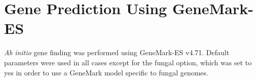 




\section{Gene Prediction Using GeneMark-ES}

\textit{Ab initio} gene finding was performed using GeneMark-ES
v4.71\cite{Borodovsky2011}. Default parameters were used in all cases
except for the fungal option, which was set to yes in order to use a
GeneMark model specific to fungal genomes. 

%

